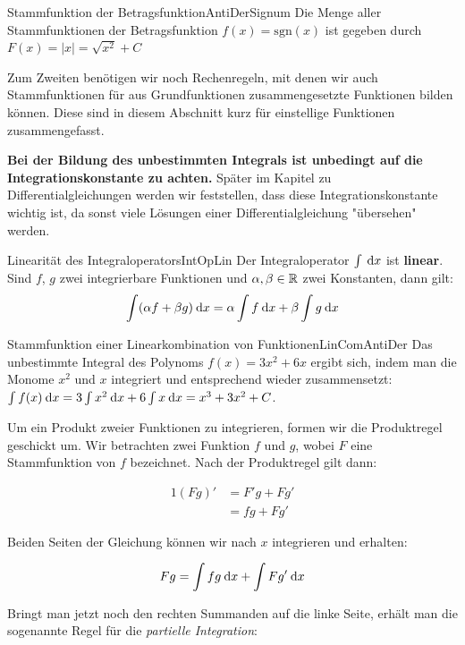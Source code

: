 \begin{statement}{Stammfunktion der Betragsfunktion}{AntiDerSignum}
    Die Menge aller Stammfunktionen der Betragsfunktion $f(x) = \text{sgn}(x)$ ist gegeben durch $F(x) = |x| = \sqrt{x^2} + C$
\end{statement}

Zum Zweiten benötigen wir noch Rechenregeln, mit denen wir auch Stammfunktionen für aus Grundfunktionen zusammengesetzte Funktionen bilden können. Diese sind in diesem Abschnitt kurz für einstellige Funktionen zusammengefasst.

\textbf{Bei der Bildung des unbestimmten Integrals ist unbedingt auf die Integrationskonstante zu achten.} Später im Kapitel zu Differentialgleichungen werden wir feststellen, dass diese Integrationskonstante wichtig ist, da sonst viele Lösungen einer Differentialgleichung "übersehen" werden.

\begin{statement}{Linearität des Integraloperators}{IntOpLin}
    Der Integraloperator $\int \:\mathrm{d}{x}$ ist \textbf{linear}. Sind $f$, $g$ zwei integrierbare Funktionen und $\alpha,\beta\in\mathbb{R}$ zwei Konstanten, dann gilt:
    $$
    \int (\alpha f + \beta g) \:\mathrm{d}{x} = \alpha \int f \:\mathrm{d}{x} + \beta \int g \:\mathrm{d}{x}
    $$
\end{statement}

\begin{example}{Stammfunktion einer Linearkombination von Funktionen}{LinComAntiDer}
    Das unbestimmte Integral des Polynoms $f(x) = 3x^2+6x$ ergibt sich, indem man die Monome $x^2$ und $x$ integriert und entsprechend wieder zusammensetzt: $\int f(x) \:\mathrm{d}{x} = 3 \int x^2 \:\mathrm{d}{x} + 6 \int x \:\mathrm{d}{x} = x^3 + 3 x^2 + C$.
\end{example}

Um ein Produkt zweier Funktionen zu integrieren, formen wir die Produktregel geschickt um. Wir betrachten zwei Funktion $f$ und $g$, wobei $F$ eine Stammfunktion von $f$ bezeichnet. Nach der Produktregel gilt dann:

\begin{alignat*}{1}
    (Fg)' &= F'g + Fg' \\
          &= fg + Fg'
\end{alignat*}

Beiden Seiten der Gleichung können wir nach $x$ integrieren und erhalten:

$$
  Fg = \int fg \:\mathrm{d}{x} + \int Fg' \:\mathrm{d}{x}
$$

Bringt man jetzt noch den rechten Summanden auf die linke Seite, erhält man die sogenannte Regel für die \emph{partielle Integration}:

